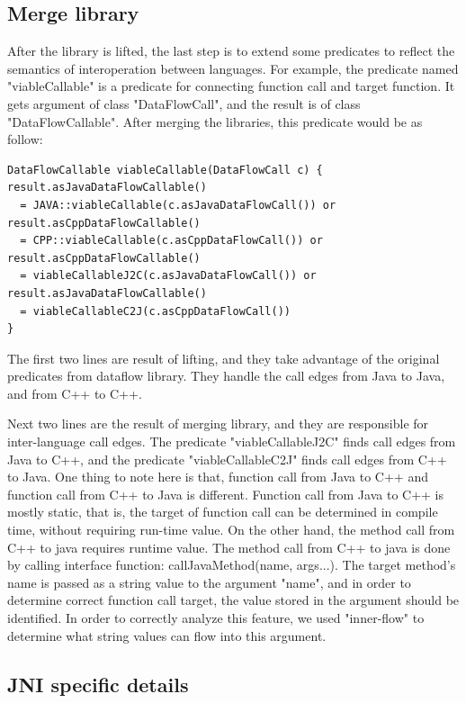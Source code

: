 \subsection{Merge library}

After the library is lifted, the last step is to extend some predicates to reflect the
semantics of interoperation between languages. For example, the predicate named "viableCallable"
is a predicate for connecting function call and target function. It gets argument of class "DataFlowCall",
and the result is of class "DataFlowCallable". After merging the libraries, this predicate would be as follow:

\begin{lstlisting}[style=codeql,xleftmargin=2.5em]
DataFlowCallable viableCallable(DataFlowCall c) {
result.asJavaDataFlowCallable()
  = JAVA::viableCallable(c.asJavaDataFlowCall()) or
result.asCppDataFlowCallable()
  = CPP::viableCallable(c.asCppDataFlowCall()) or
result.asCppDataFlowCallable()
  = viableCallableJ2C(c.asJavaDataFlowCall()) or
result.asJavaDataFlowCallable()
  = viableCallableC2J(c.asCppDataFlowCall())
}
\end{lstlisting}

The first two lines are result of lifting, and they take advantage of the
original predicates from dataflow library.  They handle the call edges from
Java to Java, and from C++ to C++.

Next two lines are the result of merging library, and they are responsible for
inter-language call edges.  The predicate "viableCallableJ2C" finds call edges
from Java to C++, and the predicate "viableCallableC2J" finds call edges from
C++ to Java. One thing to note here is that, function call from Java to C++
and function call from C++ to Java is different. Function call from Java to C++
is mostly static, that is, the target of function call can be determined in compile
time, without requiring run-time value. On the other hand, the method call from C++
to java requires runtime value. The method call from C++ to java is done by calling
interface function: callJavaMethod(name, args...). The target
method's name is passed as a string value to the argument "name",
and in order to determine correct function call target, the value stored in the argument
should be identified. In order to correctly analyze this feature, we used "inner-flow"
to determine what string values can flow into this argument.

\subsection{JNI specific details}
